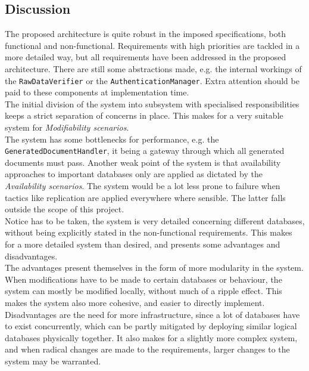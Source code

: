 \subsection{Discussion}
The proposed architecture is quite robust in the imposed specifications, both functional and non-functional. Requirements with high priorities are tackled in a more detailed way, but all requirements have been addressed in the proposed architecture. There are still some abstractions made, e.g. the internal workings of the \texttt{RawDataVerifier} or the \texttt{AuthenticationManager}. Extra attention should be paid to these components at implementation time.\\
The initial division of the system into subsystem with specialised responsibilities keeps a strict separation of concerns in place. This makes for a very suitable system for \emph{Modifiability scenarios}.\\
The system has some bottlenecks for performance, e.g. the \texttt{GeneratedDocumentHandler}, it being a gateway through which all generated documents must pass. Another weak point of the system is that availability approaches to important databases only are applied as dictated by the \emph{Availability scenarios}. The system would be a lot less prone to failure when tactics like replication are applied everywhere where sensible. The latter falls outside the scope of this project.\\
Notice has to be taken, the system is very detailed concerning different databases, without being explicitly stated in the non-functional requirements. This makes for a more detailed system than desired, and presents some advantages and disadvantages.\\
The advantages present themselves in the form of more modularity in the system. When modifications have to be made to certain databases or behaviour, the system can mostly be modified locally, without much of a ripple effect. This makes the system also more cohesive, and easier to directly implement. Disadvantages are the need for more infrastructure, since a lot of databases have to exist concurrently, which can be partly mitigated by deploying similar logical databases physically together. It also makes for a slightly more complex system, and when radical changes are made to the requirements, larger changes to the system may be warranted.

